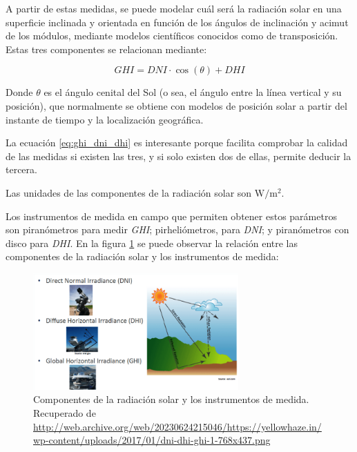 A partir de estas medidas, se puede modelar cuál será la radiación solar en una superficie inclinada y orientada en función de los ángulos de inclinación y \gls{acimut} de los módulos, mediante modelos científicos conocidos como de \gls{transposición}. Estas tres componentes se relacionan mediante:

\begin{equation} \label{eq:ghi_dni_dhi}
      GHI = DNI \cdot \cos(\theta) + DHI
\end{equation}

Donde $\theta$ es el ángulo cenital del Sol (o sea, el ángulo entre la línea vertical y su posición), que normalmente se obtiene con modelos de posición solar a partir del instante de tiempo y la localización geográfica.

La ecuación \ref{eq:ghi_dni_dhi} es interesante porque facilita comprobar la calidad de las medidas si existen las tres, y si solo existen dos de ellas, permite deducir la tercera.

Las unidades de las componentes de la radiación solar son $\si{\watt\per\meter\squared}$.

Los instrumentos de medida en campo que permiten obtener estos parámetros son \gls{piranómetros} para medir \textit{\gls{GHI}}; \gls{pirheliómetros}, para \textit{\gls{DNI}}; y \gls{piranómetros} con disco para \textit{\gls{DHI}}. En la figura \ref{fig:irrad_componentes} se puede observar la relación entre las componentes de la radiación solar y los instrumentos de medida:

\begin{figure}[H]
      \centering
      \includegraphics[width=0.7\textwidth]{./images/SoA_irrad/dni-dhi-ghi-1-768x437.png}
      \caption{Componentes de la radiación solar y los instrumentos de medida. Recuperado de \url{http://web.archive.org/web/20230624215046/https://yellowhaze.in/wp-content/uploads/2017/01/dni-dhi-ghi-1-768x437.png}}
      \label{fig:irrad_componentes}
\end{figure}

